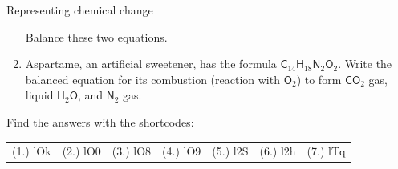\begin{eocexercises}{Representing chemical change}
\begin{enumerate}[noitemsep, label=\textbf{\arabic*}. ]
\begin{equation}
      \end{equation}
Balance these two equations.
\label{m38727*uid46}\item Aspartame, an artificial sweetener, has the formula ${\mathsf{C}}_{14}{\mathsf{H}}_{18}{\mathsf{N}}_{2}{\mathsf{O}}_{2}$. Write the balanced equation for its combustion (reaction with ${\mathsf{O}}_{2}$) to form ${\mathsf{CO}}_{2}$ gas, liquid $\mathsf{H}_{2}\mathsf{O}$, and ${\mathsf{N}}_{2}$ gas.
\end{enumerate}
  \label{m38727**end}
  \label{337cc49099d6e82169c54b5d0fc3878f**end}
\par {} Find the answers with the shortcodes:
 \par \begin{tabular}[h]{cccccc}
 (1.) lOk  &  (2.) lO0  &  (3.) lO8  &  (4.) lO9  &  (5.) l2S  &  (6.) l2h  &  (7.) lTq  & \end{tabular}
\end{eocexercises}
